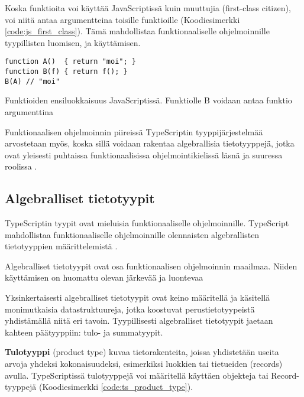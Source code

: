 Koska funktioita voi käyttää JavaScriptissä kuin muuttujia (first-class citizen), voi niitä antaa argumentteina toisille funktioille (Koodiesimerkki \ref{code:js_first_class}). Tämä mahdollistaa funktionaaliselle ohjelmoinnille tyypillisten  luomisen, ja käyttämisen.

\begin{code}
    \begin{verbatim}
function A()  { return "moi"; }
function B(f) { return f(); }
B(A) // "moi"
\end{verbatim}
    \caption{Funktioiden ensiluokkaisuus JavaScriptissä. Funktiolle B voidaan antaa funktio argumenttina}
    \label{code:js_first_class}
\end{code}

Funktionaalisen ohjelmoinnin piireissä TypeScriptin tyyppijärjestelmää arvostetaan myös, koska sillä voidaan rakentaa algebrallisia tietotyyppejä, jotka ovat yleisesti puhtaissa funktionaalisissa ohjelmointikielissä läsnä ja suuressa roolissa \cite{holvikari2021category}.


\subsection{Algebralliset tietotyypit}

TypeScriptin tyypit ovat mieluisia funktionaaliselle ohjelmoinnille. TypeScript mahdollistaa funktionaaliselle ohjelmoinnille olennaisten algebrallisten tietotyyppien määrittelemistä \cite{holvikari2021category}.

Algebralliset tietotyypit ovat osa funktionaalisen ohjelmoinnin maailmaa. Niiden käyttämisen on huomattu olevan järkevää ja luontevaa \cite{holvikari2021category,hickey_maybe_not,algebraic_data_types}

Yksinkertaisesti algebralliset tietotyypit ovat keino määritellä ja käsitellä monimutkaisia datastruktuureja, jotka koostuvat perustietotyypeistä yhdistämällä niitä eri tavoin. Tyypillisesti algebralliset tietotyypit jaetaan kahteen päätyyppiin: tulo- ja summatyypit.

\textbf{Tulotyyppi} (product type) kuvaa tietorakenteita, joissa yhdistetään useita arvoja yhdeksi kokonaisuudeksi, esimerkiksi luokkien tai tietueiden (records) avulla.
TypeScriptissä tulotyyppejä voi määritellä käyttäen objekteja tai Record-tyyppejä (Koodiesimerkki \ref{code:ts_product_type}). \citep{algebraic_data_types,holvikari2021category}

